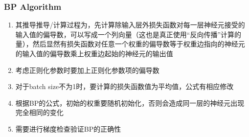 \documentclass[onecolumn]{article}
\begin{document}
        \subsubsection{BP Algorithm}
            \noindent
            \begin{enumerate}
                \item 其推导推导/计算过程为，先计算除输入层外损失函数对每一层神经元接受的输入值的偏导数，可以写成一个列向量（这也是真正使用“反向传播”计算的量），然后显然有损失函数对任意一个权重的偏导数等于权重边指向的神经元的输入值的偏导数乘上权重边起始的神经元的输出值
                \item 考虑正则化参数时要加上正则化参数项的偏导数
                \item 对于batch size不为1时，要计算的损失函数值为平均值，公式有相应修改
                \item 根据BP的公式，初始的权重要随机初始化，否则会造成同一层的神经元出现完全相同的变化
                \item 需要进行梯度检查验证BP的正确性
            \end{enumerate}
\end{document}
